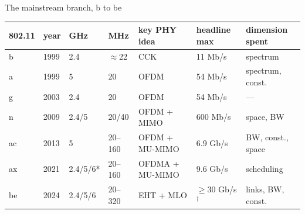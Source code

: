 \begin{frame}{The mainstream branch, b to be}
  \centering
  \scriptsize
  \setlength{\tabcolsep}{3.5pt}%
  \begin{tabular}{@{}lllllll@{}}
    \toprule
    \textbf{802.11} & \textbf{year} & \textbf{GHz} & \textbf{MHz} &
      \textbf{key PHY idea} & \textbf{headline max} &
      \textcolor{softgray}{\textbf{dimension spent}} \\
    \midrule
    b  & 1999 & 2.4     & $\approx$22 & \textcolor{ranblue}{CCK}             & 11 Mb/s
       & \textcolor{softgray}{spectrum} \\
    a  & 1999 & 5       & 20          & \textcolor{ranblue}{OFDM}            & 54 Mb/s
       & \textcolor{softgray}{spectrum, const.} \\
    g  & 2003 & 2.4     & 20          & \textcolor{ranblue}{OFDM}            & 54 Mb/s
       & \textcolor{softgray}{---} \\
    n  & 2009 & 2.4/5   & 20/40       & \textcolor{ranblue}{OFDM + MIMO}     & 600 Mb/s
       & \textcolor{softgray}{space, BW} \\
    ac & 2013 & 5       & 20--160     & \textcolor{ranblue}{OFDM + MU-MIMO}  & 6.9 Gb/s
       & \textcolor{softgray}{BW, const., space} \\
    ax & 2021 & 2.4/5/6* & 20--160    & \textcolor{ranblue}{OFDMA + MU-MIMO} & 9.6 Gb/s
       & \textcolor{softgray}{scheduling} \\
    be & 2024 & 2.4/5/6 & 20--320     & \textcolor{ranblue}{EHT + MLO}       & $\geq$30 Gb/s$^\dagger$
       & \textcolor{softgray}{links, BW, const.} \\
    \bottomrule
  \end{tabular}


\end{frame}
